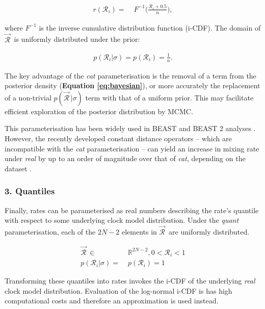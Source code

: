 \documentclass[10pt,letterpaper]{article}
\begin{document}
\begin{align}
r(\mathcal{R}_i) =& \; F^{-1}\big(\frac{\mathcal{R}_i + 0.5}{n}\big),
\end{align}

\noindent
where $F^{-1}$ is the inverse cumulative distribution function (i-CDF).
The domain of $\vec{\mathcal{R}}^{\,}$ is uniformly distributed under the prior:


\begin{align}
p(\mathcal{R}_i | \sigma) = p(\mathcal{R}_i) = \frac{1}{n}.
\end{align}



The key advantage of the \textit{cat} parameterisation is the removal of a term from the posterior density (\textbf{Equation \ref{eq:bayesian}}), or more accurately the replacement of a non-trivial $p(\vec{\mathcal{R}}^{\,} | \sigma)$ term with that of a uniform prior. 
This may facilitate efficient exploration of the posterior distribution by MCMC.




This parameterisation has been widely used in BEAST and BEAST 2 analyses \cite{drummond2006relaxed}. 
However, the recently developed constant distance operators  -- which are incompatible with the \textit{cat} parameterisation -- can yield an increase in mixing rate under \textit{real} by up to an order of magnitude over that of \textit{cat}, depending on the dataset \cite{zhang2020improving}. 






\subsubsection*{3. Quantiles}


Finally, rates can be parameterised as real numbers describing the rate's quantile with respect to some underlying clock model distribution. Under the  \textit{quant} parameterisation, each of the $2N-2$ elements in $\vec{\mathcal{R}}^{\,}$ are uniformly distributed.


\begin{align}
\vec{\mathcal{R}}^{\,} \in & \; \mathbb{R}^{2N-2}, 0 < \mathcal{R}_i < 1  \\
p(\mathcal{R}_i | \sigma) = & \; p(\mathcal{R}_i) = 1
\end{align}


Transforming these quantiles into rates invokes the i-CDF of the underlying \textit{real} clock model distribution.
Evaluation of the log-normal i-CDF is has high computational costs and
therefore an approximation is used instead.
\end{document}
